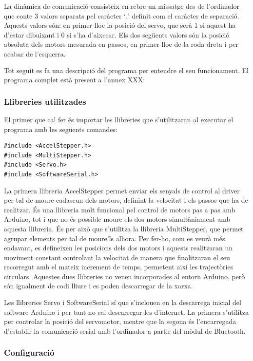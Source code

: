 La dinàmica de comunicació consisteix en rebre un missatge des de l’ordinador que conte 3 valors separats pel caràcter ‘,’ definit com el caràcter de separació. Aquests valors són: en primer lloc la posició del servo, que serà 1 si aquest ha d’estar dibuixant i 0 si s’ha d’aixecar. Els dos següents valors són la posició absoluta dels motors mesurada en passos, en primer lloc de la roda dreta i per acabar de l’esquerra. 

Tot seguit es fa una descripció del programa per entendre el seu funcionament. El programa complet està present a l’annex XXX:

\subsubsection{Llibreries utilitzades}

El primer que cal fer és importar les llibreries que s’utilitzaran al executar el programa amb les següents comandes:
 
\begin{lstlisting}[style=Arduino]
#include <AccelStepper.h>
#include <MultiStepper.h>
#include <Servo.h>
#include <SoftwareSerial.h>
\end{lstlisting}

La primera llibreria AccelStepper permet enviar els senyals de control al driver per tal de moure cadascun dels motors, definint la velocitat i els passos que ha de realitzar. És una llibreria molt funcional pel control de motors pas a pas amb Arduino, tot i que no és possible moure els dos motors simultàniament amb aquesta llibreria. És per això que s’utilitza la llibreria MultiStepper, que permet agrupar elements per tal de moure’ls alhora. Per fer-ho, com es veurà més endavant, es defineixen les posicions dels dos motors i aquests realitzaran un moviment constant controlant la velocitat de manera que finalitzaran el seu recorregut amb el mateix increment de temps, permetent així les trajectòries circulars. Aquestes dues llibreries no venen incorporades al entorn Arduino, però són igualment de codi lliure i es poden descarregar de la xarxa.
 
Les llibreries Servo i SoftwareSerial sí que s’inclouen en la descarrega inicial del software Arduino i per tant no cal descarregar-les d’internet. La primera s’utilitza per controlar la posició del servomotor, mentre que la segona és l’encarregada d’establir la comunicació serial amb l’ordinador a partir del mòdul de Bluetooth. 

\subsubsection{Configuració}

